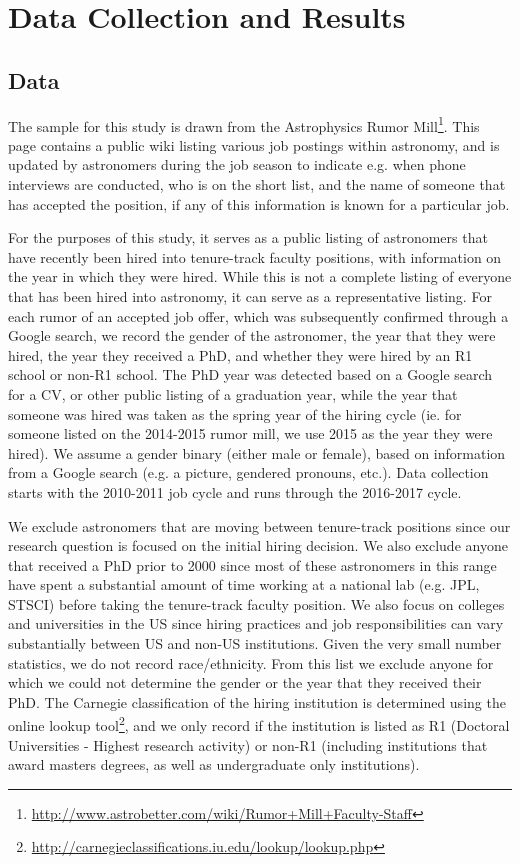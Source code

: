 \documentclass[modern]{aastex62}
\begin{document}
\section{Data Collection and Results\label{data}}

\subsection{Data}
The sample for this study is drawn from the Astrophysics Rumor Mill\footnote{\url{http://www.astrobetter.com/wiki/Rumor+Mill+Faculty-Staff}}. This page contains a public wiki listing various job postings within astronomy, and is updated by astronomers during the job season to indicate e.g. when phone interviews are conducted, who is on the short list, and the name of someone that has accepted the position, if any of this information is known for a particular job. 

For the purposes of this study, it serves as a public listing of astronomers that have recently been hired into tenure-track faculty positions, with information on the year in which they were hired. While this is not a complete listing of everyone that has been hired into astronomy, it can serve as a representative listing. For each rumor of an accepted job offer, which was subsequently confirmed through a Google search, we record the gender of the astronomer, the year that they were hired, the year they received a PhD, and whether they were hired by an R1 school or non-R1 school. The PhD year was detected based on a Google search for a CV, or other public listing of a graduation year, while the year that someone was hired was taken as the spring year of the hiring cycle (ie. for someone listed on the 2014-2015 rumor mill, we use 2015 as the year they were hired). We assume a gender binary (either male or female), based on information from a Google search (e.g. a picture, gendered pronouns, etc.). Data collection starts with the 2010-2011 job cycle and runs through the 2016-2017 cycle. 

We exclude astronomers that are moving between tenure-track positions since our research question is focused on the initial hiring decision. We also exclude anyone that received a PhD prior to 2000 since most of these astronomers in this range have spent a substantial amount of time working at a national lab (e.g. JPL, STSCI) before taking the tenure-track faculty position. We also focus on colleges and universities in the US since hiring practices and job responsibilities can vary substantially between US and non-US institutions. Given the very small number statistics, we do not record race/ethnicity. From this list we exclude anyone for which we could not determine the gender or the year that they received their PhD. The Carnegie classification of the hiring institution is determined using the online lookup tool\footnote{\url{http://carnegieclassifications.iu.edu/lookup/lookup.php}}, and we only record if the institution is listed as R1 (Doctoral Universities - Highest research activity) or non-R1 (including institutions that award masters degrees, as well as undergraduate only institutions). 
\end{document}
